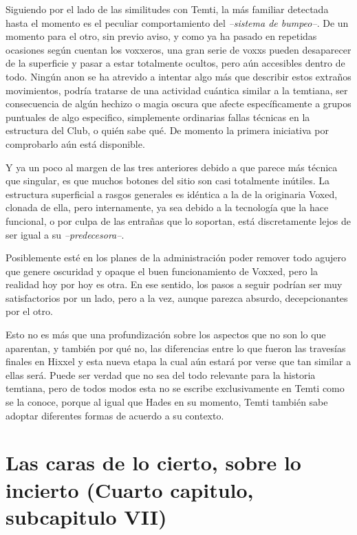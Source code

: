 \documentclass[
  spanish,
]{book}
\begin{document}
Siguiendo por el lado de las similitudes con Temti, la más familiar detectada hasta el momento es el peculiar comportamiento del \emph{--sistema de bumpeo--}. De un momento para el otro, sin previo aviso, y como ya ha pasado en repetidas ocasiones según cuentan los voxxeros, una gran serie de voxxs pueden desaparecer de la superficie y pasar a estar totalmente ocultos, pero aún accesibles dentro de todo. Ningún anon se ha atrevido a intentar algo más que describir estos extraños movimientos, podría tratarse de una actividad cuántica similar a la temtiana, ser consecuencia de algún hechizo o magia oscura que afecte específicamente a grupos puntuales de algo especifico, simplemente ordinarias fallas técnicas en la estructura del Club, o quién sabe qué. De momento la primera iniciativa por comprobarlo aún está disponible.

Y ya un poco al margen de las tres anteriores debido a que parece más técnica que singular, es que muchos botones del sitio son casi totalmente inútiles. La estructura superficial a rasgos generales es idéntica a la de la originaria Voxed, clonada de ella, pero internamente, ya sea debido a la tecnología que la hace funcional, o por culpa de las entrañas que lo soportan, está discretamente lejos de ser igual a su \emph{--predecesora--}.

Posiblemente esté en los planes de la administración poder remover todo agujero que genere oscuridad y opaque el buen funcionamiento de Voxxed, pero la realidad hoy por hoy es otra. En ese sentido, los pasos a seguir podrían ser muy satisfactorios por un lado, pero a la vez, aunque parezca absurdo, decepcionantes por el otro.

Esto no es más que una profundización sobre los aspectos que no son lo que aparentan, y también por qué no, las diferencias entre lo que fueron las travesías finales en Hixxel y esta nueva etapa la cual aún estará por verse que tan similar a ellas será. Puede ser verdad que no sea del todo relevante para la historia temtiana, pero de todos modos esta no se escribe exclusivamente en Temti como se la conoce, porque al igual que Hades en su momento, Temti también sabe adoptar diferentes formas de acuerdo a su contexto.

\hypertarget{las-caras-de-lo-cierto-sobre-lo-incierto-cuarto-capitulo-subcapitulo-vii}{%
\section{Las caras de lo cierto, sobre lo incierto (Cuarto capitulo, subcapitulo VII)}\label{las-caras-de-lo-cierto-sobre-lo-incierto-cuarto-capitulo-subcapitulo-vii}}
\end{document}
